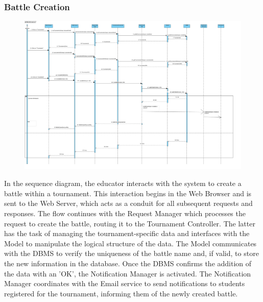 \subsubsection{Battle Creation}
\begin{figure}[H]
    \centering
    \includegraphics[width=1\textwidth]{SequenceDiagram/BattleCreation.png}
    \label{fig:enter-label}
\end{figure}
In the sequence diagram, the educator interacts with the system to create a battle within a tournament. This interaction begins in the Web Browser and is sent to the Web Server, which acts as a conduit for all subsequent requests and responses.
The flow continues with the Request Manager which processes the request to create the battle, routing it to the Tournament Controller. The latter has the task of managing the tournament-specific data and interfaces with the Model to manipulate the logical structure of the data.
The Model communicates with the DBMS to verify the uniqueness of the battle name and, if valid, to store the new information in the database. Once the DBMS confirms the addition of the data with an 'OK', the Notification Manager is activated.
The Notification Manager coordinates with the Email service to send notifications to students registered for the tournament, informing them of the newly created battle. 
